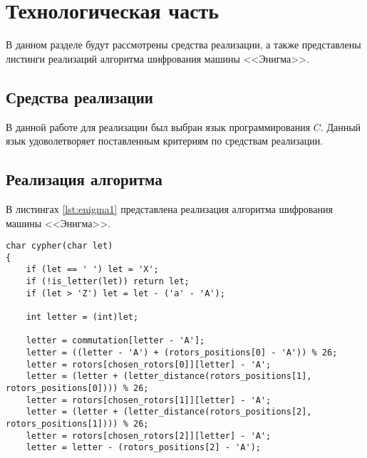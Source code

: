 \chapter{Технологическая часть}

В данном разделе будут рассмотрены средства реализации, а также представлены листинги реализаций алгоритма шифрования машины <<Энигма>>.

\section{Средства реализации}
В данной работе для реализации был выбран язык программирования $C$. Данный язык удоволетворяет поставленным критериям по средствам реализации.

\section{Реализация алгоритма}

В листингах \ref{lst:enigma1} представлена реализация алгоритма шифрования машины <<Энигма>>.

\begin{center}
    \captionsetup{justification=raggedright,singlelinecheck=off}
    \begin{lstlisting}[label=lst:enigma1,caption=Реализация алгоритма шифрования машины <<Энигма>>]
char cypher(char let)
{
    if (let == ' ') let = 'X';
    if (!is_letter(let)) return let;
    if (let > 'Z') let = let - ('a' - 'A');

    int letter = (int)let;

    letter = commutation[letter - 'A'];
    letter = ((letter - 'A') + (rotors_positions[0] - 'A')) % 26;
    letter = rotors[chosen_rotors[0]][letter] - 'A';
    letter = (letter + (letter_distance(rotors_positions[1], rotors_positions[0]))) % 26;
    letter = rotors[chosen_rotors[1]][letter] - 'A';
    letter = (letter + (letter_distance(rotors_positions[2], rotors_positions[1]))) % 26;
    letter = rotors[chosen_rotors[2]][letter] - 'A';
    letter = letter - (rotors_positions[2] - 'A');
\end{lstlisting}
\end{center}

